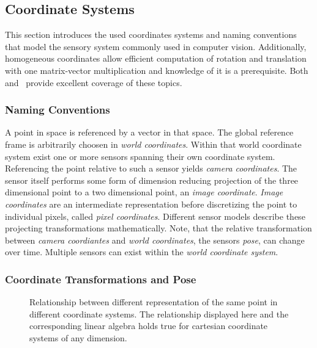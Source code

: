 \subsection{Coordinate Systems}

This section introduces the used coordinates systems and naming conventions that model the sensory system commonly used in computer vision.
Additionally, homogeneous coordinates allow efficient computation of rotation and translation with one matrix-vector multiplication and knowledge of it is a prerequisite.
Both~\cite{hartley_2004} and~\cite{corke_2011} provide excellent coverage of these topics.

\subsubsection*{Naming Conventions}

A point in space is referenced by a vector in that space.
The global reference frame is arbitrarily choosen in \emph{world coordinates}.
Within that world coordinate system exist one or more sensors spanning their own coordinate system.
Referencing the point relative to such a sensor yields \emph{camera coordinates}.
The sensor itself performs some form of dimension reducing projection of the three dimensional point to a two dimensional point, an \emph{image coordinate}.
\emph{Image coordinates} are an intermediate representation before discretizing the point to individual pixels, called \emph{pixel coordinates}.
Different sensor models describe these projecting transformations mathematically.
Note, that the relative transformation between \emph{camera coordiantes} and \emph{world coordinates}, the sensors \emph{pose}, can change over time.
Multiple sensors can exist within the \emph{world coordinate system}.

\subsubsection*{Coordinate Transformations and Pose}

\begin{figure}[H]
    \scalebox{0.8}{%
    
    }
    \caption[Coordinate Transformation]{Relationship between different representation of the same point in different coordinate systems. The relationship displayed here and the corresponding linear algebra holds true for cartesian coordinate systems of any dimension.}
\end{figure}


